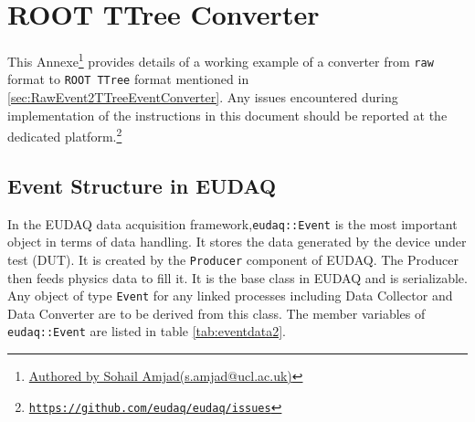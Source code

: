 \section{ROOT TTree Converter}
\label{sec:TTreeConverter}
%

This Annexe\footnote{\href{mailto:s.amjad@ucl.ac.uk} {Authored by Sohail Amjad(s.amjad@ucl.ac.uk)}} provides details of a working example of a converter from \lstinline[style=cpp]{raw} format to \lstinline[style=cpp]{ROOT TTree} format mentioned in \ref{sec:RawEvent2TTreeEventConverter}. Any issues encountered during implementation of the instructions in this document should be reported at the dedicated platform.\footnote{\href{https://github.com/eudaq/eudaq/issues}\texttt{https://github.com/eudaq/eudaq/issues}}

\subsection{Event Structure in EUDAQ} 

In the EUDAQ data acquisition framework,\lstinline[style=cpp]{eudaq::Event} is the most important object in terms of data handling. It stores the data generated by the device under test (DUT). It is created by the \lstinline[style=cpp]{Producer} component of EUDAQ. The Producer then feeds physics data to fill it. It is the base class in EUDAQ and is serializable. Any object of type \lstinline[style=cpp]{Event} for any linked processes including Data Collector and Data Converter are to be derived from this class. The member variables of \lstinline[style=cpp]{eudaq::Event} are listed in table \ref{tab:eventdata2}. 

